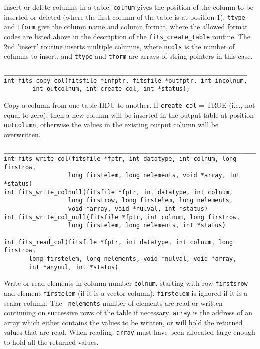 \documentclass[11pt]{article}
\begin{document}
Insert or delete columns in a table.  {\tt colnum} gives the position
of the column to be inserted or deleted (where the first column of the
table is at position 1).  {\tt ttype} and {\tt tform} give the column
name and column format, where the allowed format codes are listed above
in the description of the {\tt fits\_create\_table} routine.  The 2nd
'insert' routine inserts multiple columns, where {\tt ncols} is the
number of columns to insert, and  {\tt ttype} and {\tt tform} are
arrays of string pointers in this case.

\begin{verbatim}
____________________________________________________________________
int fits_copy_col(fitsfile *infptr, fitsfile *outfptr, int incolnum,
        int outcolnum, int create_col, int *status);
\end{verbatim}

Copy a column from one table HDU to another.  If {\tt create\_col} = TRUE (i.e., not equal to zero),
then a new column will be inserted in the output table at position
{\tt outcolumn}, otherwise the values in the existing output column will be
overwritten. 

\begin{verbatim}
__________________________________________________________________________
int fits_write_col(fitsfile *fptr, int datatype, int colnum, long firstrow,
                  long firstelem, long nelements, void *array, int *status)
int fits_write_colnull(fitsfile *fptr, int datatype, int colnum, 
                  long firstrow, long firstelem, long nelements, 
                  void *array, void *nulval, int *status)
int fits_write_col_null(fitsfile *fptr, int colnum, long firstrow,
                  long firstelem, long nelements, int *status)

int fits_read_col(fitsfile *fptr, int datatype, int colnum, long firstrow,
       long firstelem, long nelements, void *nulval, void *array, 
       int *anynul, int *status)

\end{verbatim}

Write or read elements in column number {\tt colnum}, starting with row
{\tt firstsrow} and element {\tt firstelem} (if it is a vector
column).  {\tt firstelem} is ignored if it is a scalar column. The {\tt
nelements} number of elements are read or written continuing on
successive rows of the table if necessary. {\tt array} is the address
of an array which either contains the  values to be written, or will
hold the returned values that are read.  When reading, {\tt array} must
have been allocated large enough to hold all the returned values.
\end{document}

